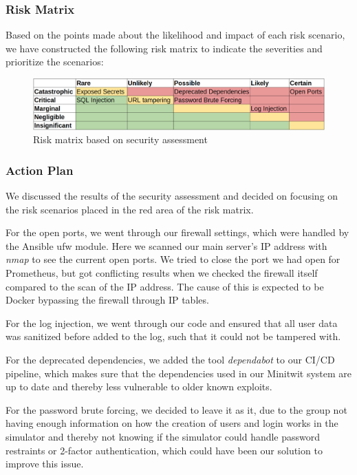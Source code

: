 \subsubsection{Risk Matrix}
Based on the points made about the likelihood and impact of each risk scenario, we have constructed the following risk matrix to indicate the severities and prioritize the scenarios:
\begin{figure}[H]
    \centering
    \includegraphics[width=1\linewidth]{images/risk-matrix.png}
    \caption{Risk matrix based on security assessment}
    \label{fig:enter-label}
\end{figure}
\subsubsection{Action Plan}
We discussed the results of the security assessment and decided on focusing on the risk scenarios placed in the red area of the risk matrix.

For the open ports, we went through our firewall settings, which were handled by the Ansible ufw module. Here we scanned our main server's IP address with \textit{nmap} to see the current open ports. We tried to close the port we had open for Prometheus, but got conflicting results when we checked the firewall itself compared to the scan of the IP address. The cause of this is expected to be Docker bypassing the firewall through IP tables.

For the log injection, we went through our code and ensured that all user data was sanitized before added to the log, such that it could not be tampered with.

For the deprecated dependencies, we added the tool \textit{dependabot} to our CI/CD pipeline, which makes sure that the dependencies used in our Minitwit system are up to date and thereby less vulnerable to older known exploits.

For the password brute forcing, we decided to leave it as it, due to the group not having enough information on how the creation of users and login works in the simulator and thereby not knowing if the simulator could handle password restraints or 2-factor authentication, which could have been our solution to improve this issue.
